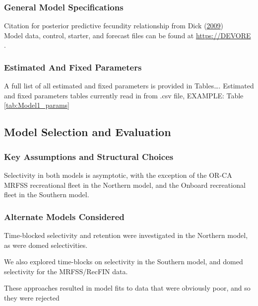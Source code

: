 \documentclass[12pt,]{article}
\begin{document}
\subsubsection{General Model
Specifications}\label{general-model-specifications}

Citation for posterior predictive fecundity relationship from Dick
(\protect\hyperlink{ref-Dick2009}{2009})\\
Model data, control, starter, and forecast files can be found at
\url{https://DEVORE} .

\subsubsection{Estimated And Fixed
Parameters}\label{estimated-and-fixed-parameters}

A full list of all estimated and fixed parameters is provided in
Tables\ldots{}. Estimated and fixed parameters tables currently read in
from .csv file, EXAMPLE: Table \ref{tab:Model1_params}

\clearpage

\subsection{Model Selection and
Evaluation}\label{model-selection-and-evaluation}

\subsubsection{Key Assumptions and Structural
Choices}\label{key-assumptions-and-structural-choices}

Selectivity in both models is asymptotic, with the exception of the
OR-CA MRFSS recreational fleet in the Northern model, and the Onboard
recreational fleet in the Southern model.

\subsubsection{Alternate Models
Considered}\label{alternate-models-considered}

Time-blocked selectivity and retention were investigated in the Northern
model, as were domed selectivities.

We also explored time-blocks on selectivity in the Southern model, and
domed selectivity for the MRFSS/RecFIN data.

These approaches resulted in model fits to data that were obviously
poor, and so they were rejected
\end{document}
